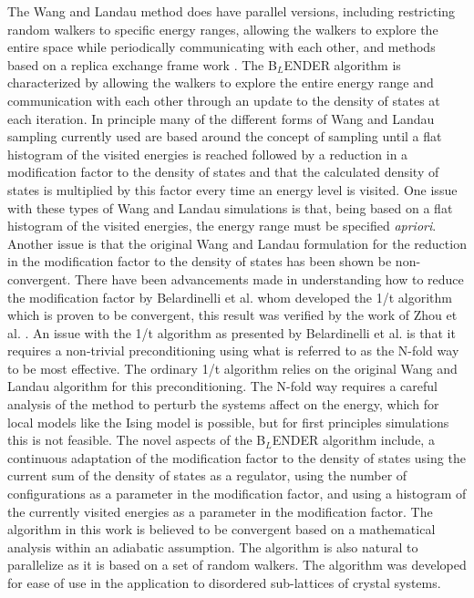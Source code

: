 \documentclass[aps,pre,reprint,superscriptaddress,showkeys]{revtex4-2}
\begin{document}
    The Wang and Landau method does have parallel versions, including  restricting random walkers to specific energy ranges, allowing the walkers to explore the entire space while periodically communicating with each other, and methods based on a replica exchange frame work \cite{MP_Wang_Landau,P_imp_Wang_Landau, Hframe_Wang_Landau, Scalable_replica_exchange}.  The B$_{L}$ENDER algorithm is characterized by allowing the walkers to explore the entire energy range and communication with each other through an update to the density of states at each iteration.  In principle many of the different forms of  Wang and Landau sampling currently used are based around the concept of sampling until a flat histogram of the visited energies is reached followed by a reduction in a modification factor to the density of states and that the calculated density of states  is multiplied by this factor every time an energy level  is visited.  One issue with these types of Wang and Landau simulations is that, being based on a flat histogram of the visited energies, the energy range must be specified \textit{apriori}. Another issue is that the original Wang and Landau formulation for the reduction in the modification factor to the  density of states has been shown be non-convergent\cite{Non_convergent_WL,Non_convergent_WL_2,non_convergence_multiple_random_walkers,Optimal_modification}.   There have been advancements made in understanding how to reduce the modification factor by Belardinelli et al. \cite{saturation} whom developed the 1/t algorithm which is proven to be convergent, this result was verified by the work of Zhou et al. \cite{Optimal_modification}. An issue with the 1/t algorithm as presented by Belardinelli et al. is that it requires a non-trivial preconditioning using what is referred to as the N-fold way to be most effective. The ordinary 1/t algorithm relies on the original Wang and Landau algorithm for this preconditioning. The N-fold way requires a careful analysis of the  method to perturb the systems affect on the energy, which for local models like the Ising model is possible, but for first principles simulations this is not feasible. The novel aspects of the B$_{L}$ENDER algorithm include, a continuous adaptation of the modification factor to the  density of states using the current sum of the density of states as a regulator, using the number of configurations as a parameter in the modification factor, and using a histogram of the currently visited energies as a parameter in the modification factor.  The algorithm in this work is believed to be convergent based on a mathematical analysis within an adiabatic assumption. The algorithm is also natural to parallelize as it is based on a set of random walkers. The algorithm was developed for ease of use in the application to disordered sub-lattices of crystal systems. 
\end{document}
